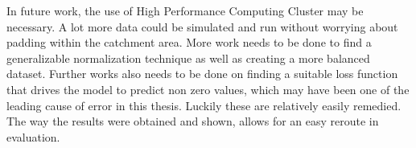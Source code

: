 In future work, the use of High Performance Computing Cluster may be necessary. A lot more data could be simulated and run without worrying about padding within the catchment area. More work needs to be done to find a generalizable normalization technique as well as creating a more balanced dataset. Further works also needs to be done on finding a suitable  loss function that drives the model to predict non zero values, which may have been one of the leading cause of error in this thesis. Luckily these are relatively easily remedied. The way the results were obtained and shown, allows for an easy reroute in evaluation.
 